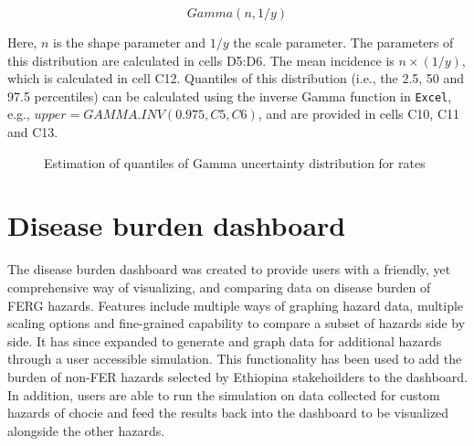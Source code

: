 \documentclass[
  letterpaper,
  DIV=11,
  numbers=noendperiod]{scrartcl}
\begin{document}
\[
Gamma(n, 1/y)
\]

Here, \(n\) is the shape parameter and \(1/y\) the scale parameter. The
parameters of this distribution are calculated in cells D5:D6. The mean
incidence is \(n \times(1/y)\), which is calculated in cell C12.
Quantiles of this distribution (i.e., the 2.5, 50 and 97.5 percentiles)
can be calculated using the inverse Gamma function in \texttt{Excel},
e.g., \(upper=GAMMA.INV(0.975,C5,C6)\), and are provided in cells C10,
C11 and C13.

\begin{figure}


\caption{\label{fig-XL-gamma}Estimation of quantiles of Gamma
uncertainty distribution for rates}

\end{figure}%

\section{Disease burden dashboard}\label{disease-burden-dashboard}

The disease burden dashboard was created to provide users with a
friendly, yet comprehensive way of visualizing, and comparing data on
disease burden of FERG hazards. Features include multiple ways of
graphing hazard data, multiple scaling options and fine-grained
capability to compare a subset of hazards side by side. It has since
expanded to generate and graph data for additional hazards through a
user accessible simulation. This functionality has been used to add the
burden of non-FER hazards selected by Ethiopina stakehoilders to the
dashboard. In addition, users are able to run the simulation on data
collected for custom hazards of chocie and feed the results back into
the dashboard to be visualized alongside the other hazards.
\end{document}
